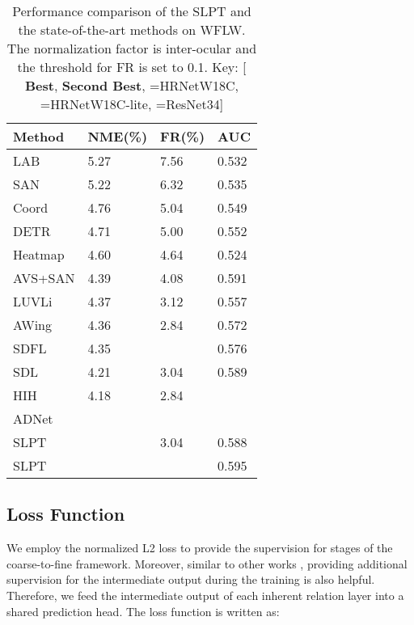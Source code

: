 \documentclass[10pt,twocolumn,letterpaper]{article}
\begin{document}
\begin{table}[t!]
	\centering
	\begin{tabular}{m{2.3cm}<{\centering}|m{1.3cm}<{\centering}m{1.3cm}<{\centering}m{1.3cm}<{\centering}}
		\hline
		Method & NME(\%) & FR(\%) & AUC\\ \hline
		LAB \cite{LAB} & 5.27 & 7.56 & 0.532 \\
		SAN \cite{SAN} & 5.22 & 6.32 & 0.535 \\
		Coord \cite{HRnet} & 4.76 & 5.04 & 0.549 \\
		DETR \cite{DETR} & 4.71 & 5.00 & 0.552 \\
		Heatmap \cite{HRnet} & 4.60 & 4.64 & 0.524 \\
		AVS+SAN \cite{AVS} & 4.39 & 4.08 & 0.591 \\
		LUVLi \cite{LUVLI} & 4.37 & 3.12 & 0.557 \\
		AWing \cite{Awing} & 4.36 & 2.84 & 0.572 \\
		SDFL \cite{SCDF} & 4.35 & {\color{red}} & 0.576 \\
		SDL \cite{SDL} & 4.21 & 3.04 & 0.589 \\
		HIH \cite{HIH} & 4.18 & 2.84 & {\color{blue}} \\ 
		ADNet \cite{ADNet} & {\color{red}} & {\color{red}} & {\color{red}} \\ \hline
		SLPT & {\color{blue} } & 3.04 & 0.588 \\
		SLPT & {\color{red}} & {\color{blue} } & 0.595 \\ \hline
	\end{tabular}
	\caption{Performance comparison of the SLPT and the state-of-the-art methods on WFLW. The normalization factor is inter-ocular and the threshold for FR is set to 0.1. Key: [{\color{red} \textbf{Best}}, {\color{blue} \textbf{Second Best}}, =HRNetW18C, =HRNetW18C-lite, =ResNet34]}
	\label{Tabal1}
\end{table}


\subsection{Loss Function}
We employ the normalized L2 loss to provide the supervision for stages of the coarse-to-fine framework. Moreover, similar to other works \cite{Hourglass, Dunet}, providing additional supervision for the intermediate output during the training is also helpful. Therefore, we feed the intermediate output of each inherent relation layer into a shared prediction head. The loss function is written as:
\end{document}
